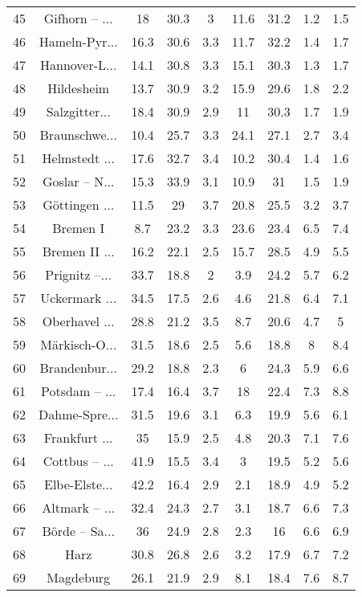 \begin{table}[!htbp]
\begin{tabular}{@{\extracolsep{5pt}} ccccccccc}
45 & Gifhorn – ... & 18 & 30.3 & 3 & 11.6 & 31.2 & 1.2 & 1.5 \\ 
46 & Hameln-Pyr... & 16.3 & 30.6 & 3.3 & 11.7 & 32.2 & 1.4 & 1.7 \\ 
47 & Hannover-L... & 14.1 & 30.8 & 3.3 & 15.1 & 30.3 & 1.3 & 1.7 \\ 
48 & Hildesheim & 13.7 & 30.9 & 3.2 & 15.9 & 29.6 & 1.8 & 2.2 \\ 
49 & Salzgitter... & 18.4 & 30.9 & 2.9 & 11 & 30.3 & 1.7 & 1.9 \\ 
50 & Braunschwe... & 10.4 & 25.7 & 3.3 & 24.1 & 27.1 & 2.7 & 3.4 \\ 
51 & Helmstedt ... & 17.6 & 32.7 & 3.4 & 10.2 & 30.4 & 1.4 & 1.6 \\ 
52 & Goslar – N... & 15.3 & 33.9 & 3.1 & 10.9 & 31 & 1.5 & 1.9 \\ 
53 & Göttingen ... & 11.5 & 29 & 3.7 & 20.8 & 25.5 & 3.2 & 3.7 \\ 
54 & Bremen I & 8.7 & 23.2 & 3.3 & 23.6 & 23.4 & 6.5 & 7.4 \\ 
55 & Bremen II ... & 16.2 & 22.1 & 2.5 & 15.7 & 28.5 & 4.9 & 5.5 \\ 
56 & Prignitz –... & 33.7 & 18.8 & 2 & 3.9 & 24.2 & 5.7 & 6.2 \\ 
57 & Uckermark ... & 34.5 & 17.5 & 2.6 & 4.6 & 21.8 & 6.4 & 7.1 \\ 
58 & Oberhavel ... & 28.8 & 21.2 & 3.5 & 8.7 & 20.6 & 4.7 & 5 \\ 
59 & Märkisch-O... & 31.5 & 18.6 & 2.5 & 5.6 & 18.8 & 8 & 8.4 \\ 
60 & Brandenbur... & 29.2 & 18.8 & 2.3 & 6 & 24.3 & 5.9 & 6.6 \\ 
61 & Potsdam – ... & 17.4 & 16.4 & 3.7 & 18 & 22.4 & 7.3 & 8.8 \\ 
62 & Dahme-Spre... & 31.5 & 19.6 & 3.1 & 6.3 & 19.9 & 5.6 & 6.1 \\ 
63 & Frankfurt ... & 35 & 15.9 & 2.5 & 4.8 & 20.3 & 7.1 & 7.6 \\ 
64 & Cottbus – ... & 41.9 & 15.5 & 3.4 & 3 & 19.5 & 5.2 & 5.6 \\ 
65 & Elbe-Elste... & 42.2 & 16.4 & 2.9 & 2.1 & 18.9 & 4.9 & 5.2 \\ 
66 & Altmark – ... & 32.4 & 24.3 & 2.7 & 3.1 & 18.7 & 6.6 & 7.3 \\ 
67 & Börde – Sa... & 36 & 24.9 & 2.8 & 2.3 & 16 & 6.6 & 6.9 \\ 
68 & Harz & 30.8 & 26.8 & 2.6 & 3.2 & 17.9 & 6.7 & 7.2 \\ 
69 & Magdeburg & 26.1 & 21.9 & 2.9 & 8.1 & 18.4 & 7.6 & 8.7 \\ 

\end{tabular}
\end{table}
